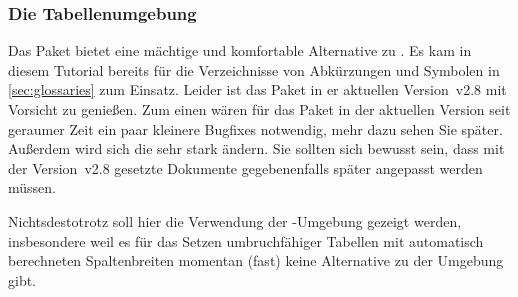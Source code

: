 \documentclass[%
  english,ngerman,%
  geometry=no,DIV=12,automark,%
]{tudscrartcl}
\begin{document}
\subsubsection{Die Tabellenumgebung }
\label{sec:tabu}
Das Paket  bietet eine mächtige und komfortable Alternative zu 
. Es kam in diesem Tutorial bereits für die Verzeichnisse von 
Abkürzungen und Symbolen in \autoref{sec:glossaries} zum Einsatz. Leider ist 
das Paket in er aktuellen Version~v2.8 mit Vorsicht zu genießen. Zum einen
wären für das Paket in der aktuellen Version seit geraumer Zeit ein paar 
kleinere Bugfixes notwendig, mehr dazu sehen Sie später. Außerdem wird sich die 
 sehr stark ändern. Sie sollten sich bewusst sein, dass mit der Version~v2.8
gesetzte Dokumente gegebenenfalls später angepasst werden müssen.

Nichtsdestotrotz soll hier die Verwendung der -Umgebung 
gezeigt werden, insbesondere weil es für das Setzen umbruchfähiger Tabellen mit 
automatisch berechneten Spaltenbreiten momentan (fast) keine Alternative zu der 
Umgebung  gibt. 
\end{document}

